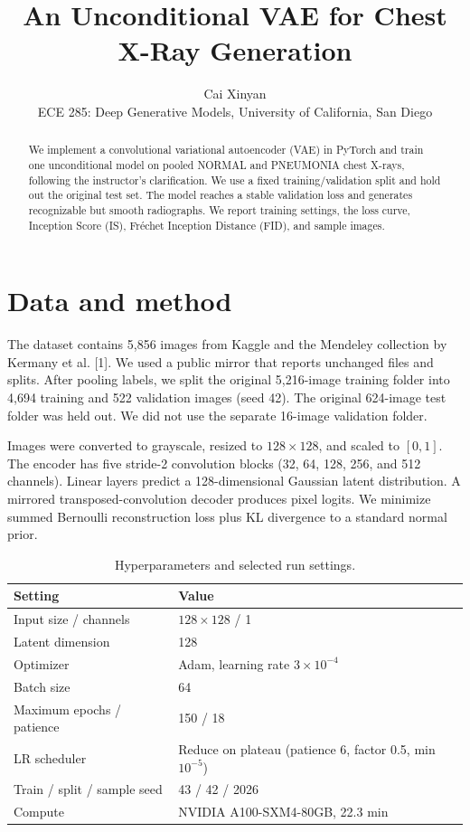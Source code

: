\documentclass{article}
\title{An Unconditional VAE for Chest X-Ray Generation}
\author{
  Cai Xinyan\\
  ECE 285: Deep Generative Models, University of California, San Diego
}
\begin{document}
\maketitle

\begin{abstract}
We implement a convolutional variational autoencoder (VAE) in PyTorch and train one unconditional model on pooled NORMAL and PNEUMONIA chest X-rays, following the instructor's clarification. We use a fixed training/validation split and hold out the original test set. The model reaches a stable validation loss and generates recognizable but smooth radiographs. We report training settings, the loss curve, Inception Score (IS), Fr\'echet Inception Distance (FID), and sample images.
\end{abstract}

\section{Data and method}
The dataset contains 5,856 images from Kaggle and the Mendeley collection by Kermany et al. [1]. We used a public mirror that reports unchanged files and splits. After pooling labels, we split the original 5,216-image training folder into 4,694 training and 522 validation images (seed 42). The original 624-image test folder was held out. We did not use the separate 16-image validation folder.

Images were converted to grayscale, resized to $128\times128$, and scaled to $[0,1]$. The encoder has five stride-2 convolution blocks (32, 64, 128, 256, and 512 channels). Linear layers predict a 128-dimensional Gaussian latent distribution. A mirrored transposed-convolution decoder produces pixel logits. We minimize summed Bernoulli reconstruction loss plus KL divergence to a standard normal prior.

\begin{table}[h]
\centering
\small
\caption{Hyperparameters and selected run settings.}
\label{tab:settings}
\begin{tabular}{ll}
\toprule
Setting & Value\\
\midrule
Input size / channels & $128\times128$ / 1\\
Latent dimension & 128\\
Optimizer & Adam, learning rate $3\times10^{-4}$\\
Batch size & 64\\
Maximum epochs / patience & 150 / 18\\
LR scheduler & Reduce on plateau (patience 6, factor 0.5, min $10^{-5}$)\\
Train / split / sample seed & 43 / 42 / 2026\\
Compute & NVIDIA A100-SXM4-80GB, 22.3 min\\
\bottomrule
\end{tabular}
\end{table}
\end{document}
